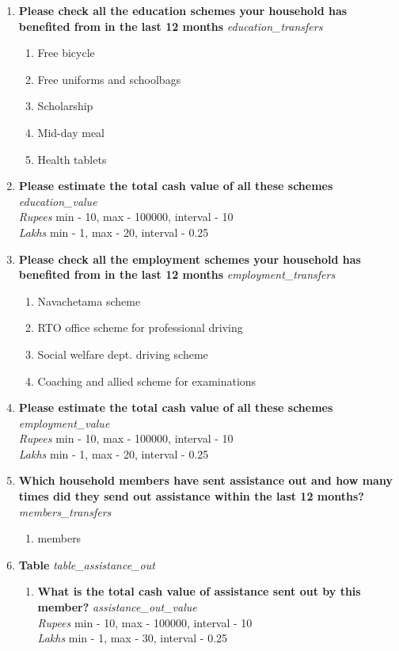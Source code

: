 \documentclass{article}
\begin{document}
\begin{enumerate}
\begin{enumerate}[label*=\arabic*.]
\end{enumerate} 
\item {\bfseries Please check all the education schemes your household has benefited from in the last 12 months}\emph{ education\_transfers } 
\begin{enumerate} 
\item Free bicycle 
\item Free uniforms and schoolbags 
\item Scholarship 
\item Mid-day meal 
\item Health tablets 
\end{enumerate} 
\item {\bfseries Please estimate the total cash value of all these schemes}\emph{ education\_value } 
\\ \emph{ Rupees }min - 10, max - 100000, interval - 10 
\\ \emph{ Lakhs }min - 1, max - 20, interval - 0.25 
 
\item {\bfseries Please check all the employment schemes your household has benefited from in the last 12 months}\emph{ employment\_transfers } 
\begin{enumerate} 
\item Navachetama scheme 
\item RTO office scheme for professional driving 
\item Social welfare dept. driving scheme 
\item Coaching and allied scheme for examinations 
\end{enumerate} 
\item {\bfseries Please estimate the total cash value of all these schemes}\emph{ employment\_value } 
\\ \emph{ Rupees }min - 10, max - 100000, interval - 10 
\\ \emph{ Lakhs }min - 1, max - 20, interval - 0.25 
 
\item {\bfseries Which household members have sent assistance out and how many times did they send out assistance within the last 12 months?}\emph{ members\_transfers } 
\begin{enumerate} 
\item members 
\end{enumerate} 
\item {\bfseries Table}\emph{ table\_assistance\_out } 
\begin{enumerate}[label*=\arabic*.] 
\item {\bfseries What is the total cash value of assistance sent out by this member?}\emph{ assistance\_out\_value } 
\\ \emph{ Rupees }min - 10, max - 100000, interval - 10 
\\ \emph{ Lakhs }min - 1, max - 30, interval - 0.25 
 

\end{enumerate}
\end{enumerate}
\end{document}
